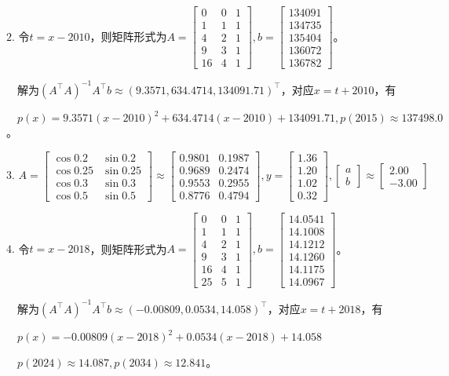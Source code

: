 \documentclass[cn,hazy,green,11pt,normal]{elegantnote}
\begin{document}
    $2.\,\,$令$t=x-2010$，则矩阵形式为$A=\begin{bmatrix}0&0&1\\1&1&1\\4&2&1\\9&3&1\\16&4&1\end{bmatrix},b=\begin{bmatrix}134091\\134735\\135404\\136072\\136782\end{bmatrix}$。

    $\quad$解为$(A^{\top}A)^{-1}A^{\top}b\approx(9.3571,634.4714,134091.71)^{\top}$，对应$x=t+2010$，有

    $\quad p(x)=9.3571(x-2010)^2+634.4714(x-2010)+134091.71,p(2015)\approx137498.0$。

    $3.\,\,A=\begin{bmatrix}\cos0.2&\sin0.2\\\cos0.25&\sin0.25\\\cos0.3&\sin0.3\\\cos0.5&\sin0.5\end{bmatrix} \approx\begin{bmatrix}0.9801&0.1987\\0.9689&0.2474\\0.9553&0.2955\\0.8776&0.4794\end{bmatrix},y= \begin{bmatrix}1.36\\1.20\\1.02\\0.32\end{bmatrix},\begin{bmatrix}a\\b\end{bmatrix}\approx\begin{bmatrix}2.00\\-3.00\end{bmatrix}$

    $4.\,\,$令$t=x-2018$，则矩阵形式为$A=\begin{bmatrix}0&0&1\\1&1&1\\4&2&1\\9&3&1\\16&4&1\\25&5&1\end{bmatrix},b=\begin{bmatrix}14.0541\\14.1008\\14.1212\\14.1260\\14.1175\\14.0967\end{bmatrix}$。

    $\quad$解为$(A^{\top}A)^{-1}A^{\top}b\approx(-0.00809,0.0534,14.058)^{\top}$，对应$x=t+2018$，有

    $\quad p(x)=-0.00809(x-2018)^2+0.0534(x-2018)+14.058$

    $\quad p(2024)\approx14.087,p(2034)\approx12.841$。
\end{document}
